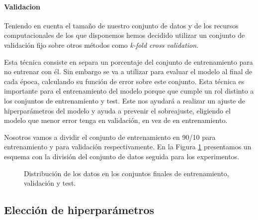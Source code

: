 \paragraph*{Validacion}

Teniendo en cuenta el tamaño de nuestro conjunto de datos y de los recursos computacionales de los que disponemos hemos decidido utilizar un conjunto de validación fijo sobre otros métodos como \textit{k-fold cross validation}. 


Esta técnica consiste en separa un porcentaje del conjunto de entrenamiento para no entrenar con él. Sin embargo se va a utilizar para evaluar el modelo al final de cada época, calculando su función de error sobre este conjunto. Esta técnica es importante para el entrenamiento del modelo porque que cumple un rol distinto a los conjuntos de entrenamiento y test. Este nos ayudará a realizar un ajuste de hiperparámetros del modelo y ayuda a prevenir el sobreajuste, eligiendo el modelo que menor error tenga en validación, en vez de en entrenamiento. 

Nosotros vamos a dividir el conjunto de entrenamiento en 90/10 para entrenamiento y para validación respectivamente. En la Figura \ref{fig:distribucionTrainTestVal} presentamos un esquema con la división del conjunto de datos seguida para los experimentos.


\begin{figure}[h!]
\noindent
{}
\caption{Distribución de los datos en los conjuntos finales de entrenamiento, validación y test.}
\label{fig:distribucionTrainTestVal}
\end{figure}

\subsection{Elección de hiperparámetros}


